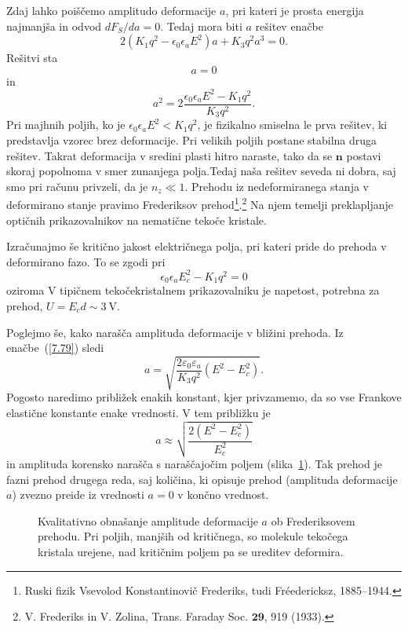 Zdaj lahko poiščemo amplitudo deformacije $a$, pri kateri je prosta energija
najmanjša in odvod $dF_S/da=0$. Tedaj mora biti $a$ rešitev enačbe 
\begin{equation}
2(K_{1}q^{2}-\epsilon_{0}\epsilon_{a}E^2)a+K_{3}q^{2}a^{3}=0.
\label{7.78}
\end{equation}
 Rešitvi sta 
\begin{equation}
a=0
\end{equation}
in
\begin{equation}
a^{2}=2\frac{\epsilon_{0}\epsilon_{a}E^2-K_{1}q^{2}}{K_{3}q^{2}}.
\label{7.79}
\end{equation}
 Pri majhnih poljih, ko je $\epsilon_{0}\epsilon_{a}E^2<K_{1}q^{2}$,
je fizikalno smiselna le prva rešitev, ki predstavlja vzorec brez deformacije. Pri 
velikih poljih postane stabilna druga rešitev. Takrat deformacija
v sredini plasti hitro naraste, tako da se $\mathbf{n}$ postavi skoraj
popolnoma v smer zunanjega polja.Tedaj naša rešitev seveda ni dobra,
saj smo pri računu privzeli, da je $n_{z}\ll1$. Prehodu iz nedeformiranega
stanja v deformirano stanje pravimo  Frederiksov prehod\footnote{Ruski fizik
Vsevolod Konstantinovič Frederiks, tudi Fr\'{e}edericksz, 1885--1944.}.\footnote{
V. Frederiks in V. Zolina, Trans. Faraday Soc. $\mathbf{29}$, 919 (1933).}  Na njem
temelji preklapljanje optičnih prikazovalnikov na nematične tekoče kristale.

Izračunajmo še kritično jakost električnega polja, pri kateri pride do prehoda v deformirano fazo.
To se zgodi pri 
\begin{equation}
\epsilon_{0}\epsilon_{a}E_c^2-K_{1}q^{2} = 0
\end{equation}
oziroma
V tipičnem tekočekristalnem prikazovalniku je napetost, potrebna za prehod, $U = E_cd \sim 3~\si{\volt}$. 

Poglejmo še, kako narašča amplituda deformacije v bližini prehoda. Iz enačbe~(\ref{7.79})
sledi 
\begin{equation}
a = \sqrt{\frac{2 \varepsilon_0 \varepsilon_a}{K_3 q^2 }(E^2-E_c^2)}.
\end{equation}
Pogosto naredimo približek enakih konstant, kjer privzamemo, da so vse Frankove 
elastične konstante enake vrednosti. V tem približku je 
\begin{equation}
a \approx \sqrt{\frac{2(E^2-E_c^2)}{E_c^2}}
\end{equation}
in amplituda korensko narašča s naraščajočim poljem (slika~\ref{Fred}). Tak prehod je
fazni prehod drugega reda, saj količina, ki opisuje prehod (amplituda deformacije $a$)
zvezno preide iz vrednosti $a=0$ v končno vrednost. 
\begin{figure}[ht]
\centering
\def\svgwidth{70truemm} 

\caption{Kvalitativno obnašanje amplitude deformacije $a$ ob Frederiksovem prehodu. Pri poljih, 
manjših od kritičnega, so molekule tekočega kristala urejene, nad kritičnim poljem
pa se ureditev deformira.}
\label{Fred}
\end{figure}

